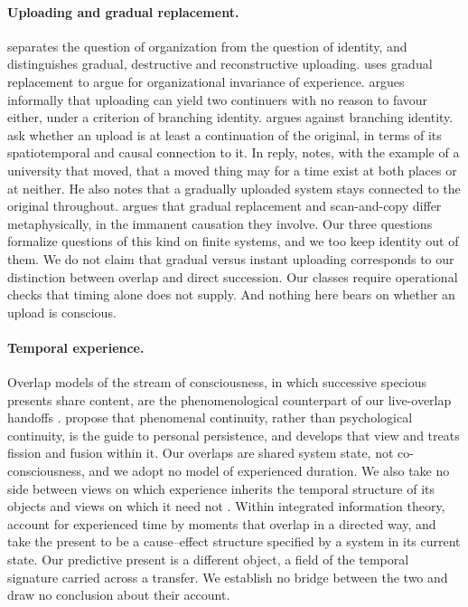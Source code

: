 \paragraph{Uploading and gradual replacement.}
\citet{Chalmers2010Singularity} separates the question of organization from
the question of identity, and distinguishes gradual, destructive and
reconstructive uploading. \citet{Chalmers1995Qualia} uses gradual replacement
to argue for organizational invariance of experience.
\citet{Cerullo2015} argues informally that uploading can yield two
continuers with no reason to favour either, under a criterion of branching
identity. \citet{Bauer2017} argues against branching identity.
\citet{CorabiSchneider2012} ask whether an upload is at least a continuation of
the original, in terms of its spatiotemporal and causal connection to it. In
reply, \citet{Chalmers2012Reply} notes, with the example of a university that
moved, that a moved thing may for a time exist at both places or at neither.
He also notes that a gradually uploaded system stays connected to the
original throughout. \citet{Weber2025Selective} argues that gradual replacement
and scan-and-copy differ metaphysically, in the immanent causation they
involve. Our three questions formalize
questions of this kind on finite systems, and we too keep identity out of
them. We do not claim that gradual versus instant uploading corresponds to our
distinction between overlap and direct succession. Our classes require
operational checks that timing alone does not supply. And nothing here bears
on whether an upload is conscious.

\paragraph{Temporal experience.}
Overlap models of the stream of consciousness, in which successive specious
presents \citep[ch.~XV]{James1890} share content, are the phenomenological
counterpart of our live-overlap handoffs \citep{Dainton2000, Dainton2023SEP}.
\citet{DaintonBayne2005} propose that phenomenal continuity, rather than
psychological continuity, is the guide to personal persistence, and
\citet{Dainton2008} develops that view and treats fission and fusion within
it. Our overlaps are shared system
state, not co-consciousness, and we adopt no model of experienced duration. We
also take no side between views on which experience inherits the temporal
structure of its objects \citep{Phillips2014} and views on which it need not
\citep{Lee2014}. Within integrated information theory,
\citet{ComolattiGrassoTononi2025} account for experienced time by moments that
overlap in a directed way, and take the present to be a cause--effect
structure specified by a system in its current state. Our predictive present
is a different object, a field of the temporal signature carried across a
transfer. We establish no bridge between the two and draw no conclusion about
their account.

